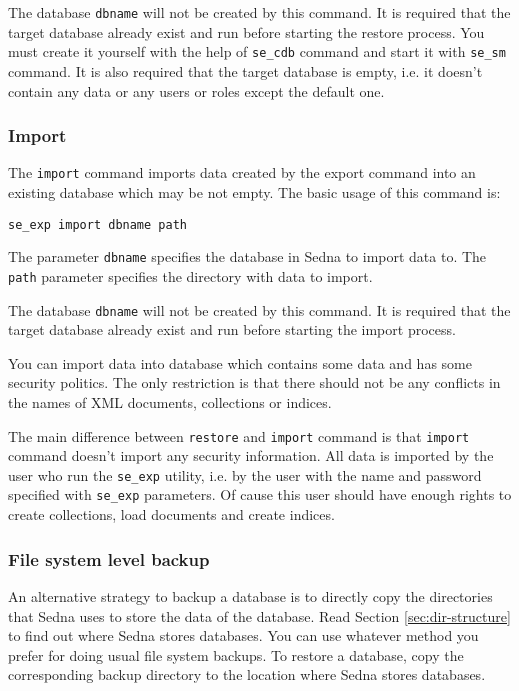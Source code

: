 \documentclass[a4paper,12pt]{article}
\begin{document}
The database \verb!dbname! will not be created by this command. It is required that the target database 
already exist and run before starting the restore process. You must create it yourself with the help
of \verb!se_cdb! command and start it with \verb!se_sm! command. It is also required that the target 
database is empty, i.e. it doesn't contain any data or any users or roles except the default one.




\subsubsection*{Import}

The \verb!import! command imports data created by the export command into an existing database
which may be not empty. The basic usage of this command is:

\begin{verbatim}
se_exp import dbname path
\end{verbatim}  

The parameter \verb!dbname! specifies the database in Sedna to import data to. The \verb!path!
parameter specifies the directory with data to import. 

The database \verb!dbname! will not be created by this command. It is required that the target database 
already exist and run before starting the import process. 

You can import data into database which contains some data and has some security politics. The only
restriction is that there should not be any conflicts in the names of XML documents, collections or
indices. 

The main difference between \verb!restore! and \verb!import! command is that \verb!import! command 
doesn't import any security information. All data is imported by the user who run the \verb!se_exp! 
utility, i.e. by the user with the name and password specified with \verb!se_exp! parameters. Of cause 
this user should have enough rights to create collections, load documents and create indices.






\subsubsection{File system level backup}

An alternative strategy to backup a database is to directly copy the directories that Sedna
uses to store the data of the database. Read Section \ref{sec:dir-structure} to find out where
Sedna stores databases. You can use whatever method you prefer for doing usual file system backups.
To restore a database, copy the corresponding backup directory to the location where Sedna stores
databases.
\end{document}

